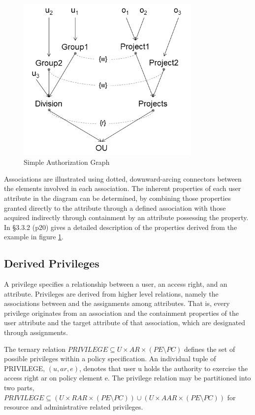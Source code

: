 \documentclass[12pt,a4paper,titlepage]{book}
\begin{document}
		\begin{figure}[h]
			\centering
			\includegraphics[width = 0.8\textwidth]{images/simple_authorization_graph.png}
			\caption{Simple Authorization Graph}
			\label{fig:SimpleAuthorizationGraph}
		\end{figure}
		
		Associations are illustrated using dotted, downward-arcing connectors between the elements involved in each association. The inherent properties of each user attribute in the diagram can be determined, by combining those properties granted directly to the attribute through a defined association with those acquired indirectly through containment by an attribute possessing the property. In \cite{NISTIR-7987-REV-1} \S 3.3.2 (p20) gives a detailed description of the properties derived from the example in figure \ref{fig:SimpleAuthorizationGraph}.
		
		\subsection{Derived Privileges}
		
		A privilege specifies a relationship between a user, an access right, and an attribute. Privileges are derived from higher level relations, namely the associations between and the assignments among attributes. That is, every privilege originates from an association and the containment properties of the user attribute and the target attribute of that association, which are designated through assignments.
		
		The ternary relation $ PRIVILEGE \subseteq U \times AR \times (PE \setminus PC) $ defines the set of possible privileges within a policy specification. An individual tuple of PRIVILEGE, $ (u, ar, e) $, denotes that user u holds the authority to exercise the access right ar on policy element e. The privilege relation may be partitioned into two parts, $ PRIVILEGE \subseteq (U \times RAR \times (PE \setminus PC)) \cup (U \times AAR \times (PE \setminus PC))$ for resource and administrative related privileges.
		
\end{document}
